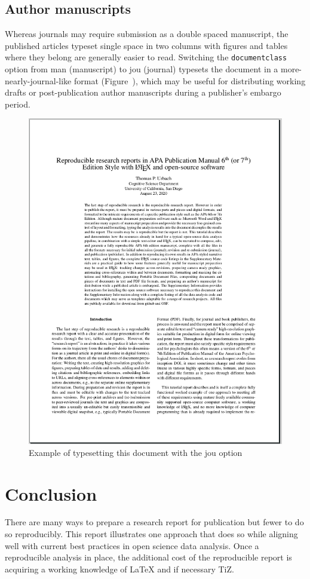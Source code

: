 \documentclass[helv,10pt,man,floatsintext]{apa6}  %
\begin{document}
\subsection{Author manuscripts}

Whereas journals may require submission as a double spaced manuscript,
the published articles typeset single space in two columns with
figures and tables where they belong are generally easier to read.
Switching the \texttt{documentclass} option from man
(manuscript) to jou (journal) typesets the document in a
more-nearly-journal-like format (Figure~), which
may be useful for distributing working drafts or post-publication
author manuscripts during a publisher's embargo period.

\begin{figure}
\caption{Example of typesetting this document with the jou option}
\centering
\includegraphics[width=.65\textwidth]{images/apa67_jou.png}
\end{figure}


\section{Conclusion}

There are many ways to prepare a research report for publication but
fewer to do so reproducibly. This report illustrates one approach that
does so while aligning well with current best practices in open
science data analysis. Once a reproducible analysis in place, the
additional cost of the reproducible report is acquiring a working
knowledge of \LaTeX{} and if necessary Ti{\it}Z. 

\newpage
\printbibliography
\end{document}
